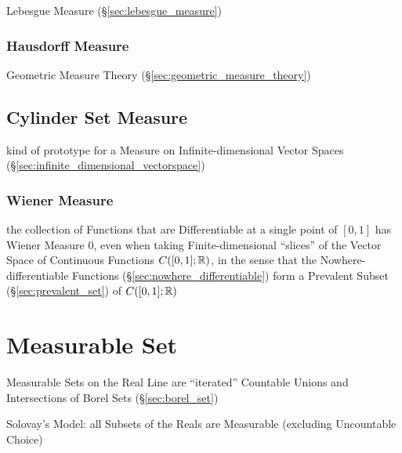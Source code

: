 Lebesgue Measure (\S\ref{sec:lebesgue_measure})



\subsubsection{Hausdorff Measure}\label{sec:hausdorff_measure}

\fist Geometric Measure Theory (\S\ref{sec:geometric_measure_theory})



\subsection{Cylinder Set Measure}\label{sec:cylinder_set_measure}

kind of prototype for a Measure on Infinite-dimensional Vector Spaces
(\S\ref{sec:infinite_dimensional_vectorspace})



\subsubsection{Wiener Measure}\label{sec:wiener_measure}\hfill

the collection of Functions that are Differentiable at a single point of
$[0,1]$ has Wiener Measure $0$, even when taking Finite-dimensional ``slices''
of the Vector Space of Continuous Functions $C([0,1];\mathbb{R})$, in the sense
that the Nowhere-differentiable Functions (\S\ref{sec:nowhere_differentiable})
form a Prevalent Subset (\S\ref{sec:prevalent_set}) of $C([0,1]; \mathbb{R})$



\section{Measurable Set}\label{sec:measurable_set}

Measurable Sets on the Real Line are ``iterated'' Countable Unions and
Intersections of Borel Sets (\S\ref{sec:borel_set})

Solovay's Model: all Subsets of the Reals are Measurable (excluding Uncountable
Choice)



